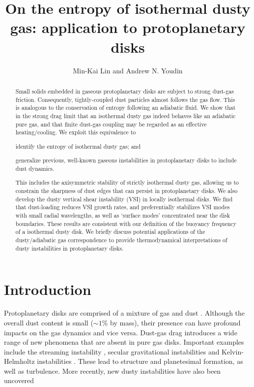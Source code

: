 \documentclass[iop, numberedappendix]{emulateapj}
\begin{document}
\title{On the entropy of 
  isothermal dusty gas: application to protoplanetary disks}  
\author{Min-Kai Lin and Andrew N. Youdin}

\begin{abstract}
  Small solids embedded in gaseous protoplanetary disks are subject
  to strong dust-gas friction. Consequently, tightly-coupled dust
  particles almost follows the gas flow. 
  This is analogous to the 
  conservation of entropy 
  following an adiabatic fluid.  We show that in the strong drag
  limit that an isothermal dusty gas indeed behaves like an  
  adiabatic pure gas, and that finite dust-gas coupling may be
  regarded as an effective 
  heating/cooling. We exploit this equivalence 
  to 
\begin{inparaenum}[1)]
\item
  identify the entropy of isothermal dusty gas; and 
\item 
  generalize previous, well-known gaseous instabilities in
  protoplanetary disks to include dust dynamics. 
\end{inparaenum}
This includes the axisymmetric stability of strictly isothermal dusty
gas, allowing us to constrain the sharpness of 
dust edges that can persist in protoplanetary disks. We also develop 
the dusty vertical shear instability (VSI) in locally isothermal
disks. We find that  dust-loading reduces VSI growth rates, and
preferentially stabilizes VSI modes with small radial 
wavelengths, as well as `surface modes' concentrated near the
disk boundaries. These results are consistent with our definition of
the buoyancy frequency of a isothermal dusty disk. 
We briefly discuss potential applications of the dusty/adiabatic gas
correspondence to provide thermodynamical interpretations of dusty
instabilities in protoplanetary disks.  
\end{abstract}

\section{Introduction}
Protoplanetary disks are comprised of a mixture of gas and dust
\citep{chiang10}. Although the overall dust content is small
($\sim 1\%$ by mass), their presence can have profound impacts on the 
gas dynamics and vice versa. Dust-gas drag introduces a 
wide range of new phenomena that are absent in pure gas
disks. Important examples include the streaming instability
\citep{youdin05a,youdin07b,johansen07}, secular gravitational
instabilities \citep{ward00,youdin11,michikoshi12,takahashi14} and
Kelvin-Helmholtz instabilities
\citep{chiang08,barranco09,lee10}. These lead to structure and
planetesimal formation, as well as turbulence. More recently, new
dusty instabilities have also been uncovered
\citep{loren15,loren16,lamb16}  
\end{document}
